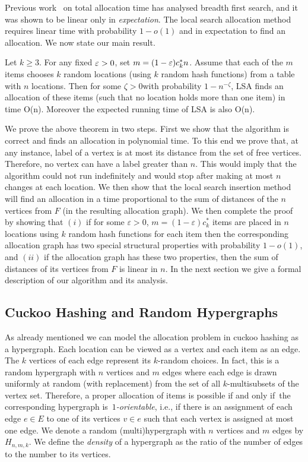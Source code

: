 Previous work~\cite{inc:fpss03} on total allocation time has analysed breadth first search, and it was shown  to be linear only in \emph{expectation}.  The local search allocation method requires linear time with probability $1-o(1)$  and in expectation to find an allocation. We now state our main result.

\begin{theorem}\label{thm:main}
Let $k\ge 3$. For any fixed $\varepsilon >0$, set $m=(1-\varepsilon) c_k^* n$.  Assume that each of the $m$ items chooses $k$ random locations (using $k$ random hash functions) from a table with $n$ locations. Then for some $\zeta>0$with probability $1-n^{-\zeta}$, LSA finds an allocation of these items (such that no location holds more than one item) in time O(n). Moreover the expected running time of LSA is also O(n).
\end{theorem}
We prove the above theorem in two steps. First we show that the algorithm is correct and finds an allocation in polynomial time. To this end we prove that, at any instance, label of a vertex is at most its distance from the set of free vertices. Therefore, no vertex can have a label greater than $n$. This would imply that the algorithm could not run indefinitely and would stop after making at most $n$ changes at each location. 
We then show that the local search insertion method will find an allocation in a time proportional to the sum of distances of the $n$ vertices from $F$ (in the resulting allocation graph). 
We then complete the proof by showing that  $(i)$ if for some $\varepsilon >0$, $m=(1-\varepsilon)c^*_k$ items are placed in $n$ locations using $k$ random hash functions for each item then the corresponding allocation graph has two special structural properties with probability $1-o(1)$, and $(ii)$ if  the allocation graph has these two properties, then the sum of distances of its vertices from $F$ is linear in $n$. In the next section we give a formal description of our algorithm and its analysis.
\subsection*{Cuckoo Hashing and Random Hypergraphs}
As already mentioned we can model the allocation problem in cuckoo hashing as a hypergraph. Each location can be viewed as a vertex and each item as an edge. The $k$ vertices of each edge represent its $k$-random choices. In fact, this is a random hypergraph  with $n$ vertices and $m$ edges where each edge is drawn uniformly at random (with replacement) from the set of all $k$-multisubsets of the vertex set.
Therefore, a proper allocation of items is possible if and only if~the corresponding hypergraph is~\emph{$1$-orientable}, i.e., if there is an assignment of each edge $e\in E$ to one of its vertices $v\in e$ such that each vertex is assigned at most one edge. We denote a random (multi)hypergraph with $n$ vertices and $m$ edges by $H_{n,m,k}$.
We define the \emph{density} of a hypergraph as the ratio of the number of edges to the number to its vertices.

